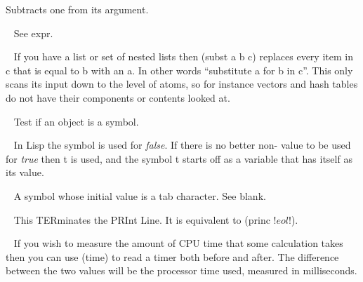 \begin{description}
Subtracts one from its argument.
\item[{\tx subr~~~~~~~~~} \hspace{1cm} {\em symbol}]~\newline
See {\tx expr}.
\item[{\tx subst~~~~~~~~} \hspace{1cm} {\em function 3 args}]~\newline
If you have a list or set of nested lists then {\tx (subst a b c)} replaces every
item in {\tx c} that is equal to {\tx b} with an {\tx a}. In other
words ``substitute a for b in c''. This only scans its input down to the
level of atoms, so for instance vectors and hash tables do not have their
components or contents looked at.
\item[{\tx symbolp~~~~~~} \hspace{1cm} {\em function 1 arg}]~\newline
Test if an object is a symbol.
\item[{\tx t~~~~~~~~~~~~} \hspace{1cm} {\em predefined variable}]~\newline
In Lisp the symbol \nil{} is used for {\em false}. If there is no better
non-\nil{} value to be used for {\em true} then {\tx t} is used, and the
symbol {\tx t} starts off as a variable that has itself as its value.
\item[{\tx tab~~~~~~~~~~} \hspace{1cm} {\em predefined variable}]~\newline
A symbol whose initial value is a tab character. See {\tx blank}.
\item[{\tx terpri~~~~~~~} \hspace{1cm} {\em function 0 args}]~\newline
This TERminates the PRInt Line. It is equivalent to {\tx (princ !$eol!$)}.
\item[{\tx time~~~~~~~~~} \hspace{1cm} {\em function 0 args}]~\newline
If you wish to measure the amount of CPU time that some calculation takes then
you can use {\tx (time)} to read a timer both before and after. The difference
between the two values will be the processor time used, measured in
milliseconds.
\item[{\tx times~~~~~~~~} \hspace{1cm} {\em special form}]~\newline

\end{description}
